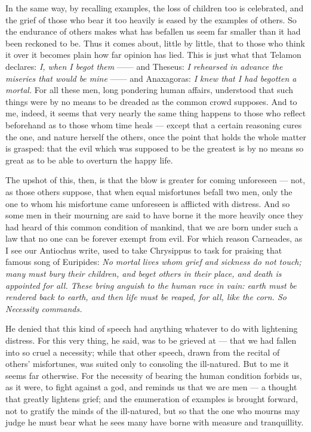  In the same way, by recalling examples, the loss of children too is celebrated, and the grief of those who bear it too heavily is eased by the examples of others. So the endurance of others makes what has befallen us seem far smaller than it had been reckoned to be. Thus it comes about, little by little, that to those who think it over it becomes plain how far opinion has lied. This is just what that Telamon declares: \textit{I, when I begot them} —— and Theseus: \textit{I rehearsed in advance the miseries that would be mine} —— and Anaxagoras: \textit{I knew that I had begotten a mortal.} For all these men, long pondering human affairs, understood that such things were by no means to be dreaded as the common crowd supposes. And to me, indeed, it seems that very nearly the same thing happens to those who reflect beforehand as to those whom time heals — except that a certain reasoning cures the one, and nature herself the others, once the point that holds the whole matter is grasped: that the evil which was supposed to be the greatest is by no means so great as to be able to overturn the happy life.

 The upshot of this, then, is that the blow is greater for coming unforeseen — not, as those others suppose, that when equal misfortunes befall two men, only the one to whom his misfortune came unforeseen is afflicted with distress. And so some men in their mourning are said to have borne it the more heavily once they had heard of this common condition of mankind, that we are born under such a law that no one can be forever exempt from evil. For which reason Carneades, as I see our Antiochus write, used to take Chrysippus to task for praising that famous song of Euripides: \textit{No mortal lives whom grief and sickness do not touch; many must bury their children, and beget others in their place, and death is appointed for all. These bring anguish to the human race in vain: earth must be rendered back to earth, and then life must be reaped, for all, like the corn. So Necessity commands.}

 He denied that this kind of speech had anything whatever to do with lightening distress. For this very thing, he said, was to be grieved at — that we had fallen into so cruel a necessity; while that other speech, drawn from the recital of others' misfortunes, was suited only to consoling the ill-natured. But to me it seems far otherwise. For the necessity of bearing the human condition forbids us, as it were, to fight against a god, and reminds us that we are men — a thought that greatly lightens grief; and the enumeration of examples is brought forward, not to gratify the minds of the ill-natured, but so that the one who mourns may judge he must bear what he sees many have borne with measure and tranquillity.

